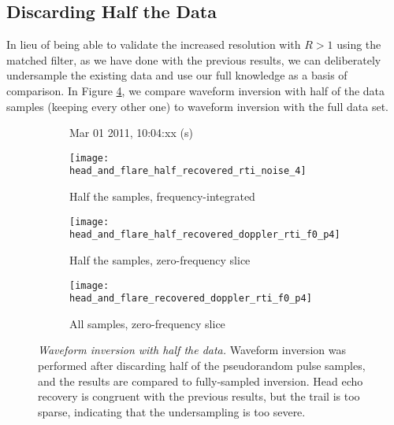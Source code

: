 \subsection{Discarding Half the Data}
In lieu of being able to validate the increased resolution with $R>1$ using the matched filter, as we have done with the previous results, we can deliberately undersample the existing data and use our full knowledge as a basis of comparison. In Figure \ref{fig:half_sampling_comparison}, we compare waveform inversion with half of the data samples (keeping every other one) to waveform inversion with the full data set.
\begin{figure}[tpb]
 \vspace{-1.5\baselineskip}
 \begin{subfigure}{\textwidth}
  \centering
  \textsf{\footnotesize Mar 01 2011, 10:04:xx (s)}
  
  \texttt{[image: head\_and\_flare\_half\_recovered\_rti\_noise\_4]}
  \caption{Half the samples, frequency-integrated}
  \label{fig:half_recovered}
 \end{subfigure}
 
 \vspace{0.5\baselineskip}
 \begin{subfigure}{\textwidth}
  \centering
  \texttt{[image: head\_and\_flare\_half\_recovered\_doppler\_rti\_f0\_p4]}
  \caption{Half the samples, zero-frequency slice}
  \label{fig:half_recovered_doppler0}
 \end{subfigure}
 
 \vspace{0.5\baselineskip}
 \begin{subfigure}{\textwidth}
  \centering
  \texttt{[image: head\_and\_flare\_recovered\_doppler\_rti\_f0\_p4]}
  \caption{All samples, zero-frequency slice}
  \label{fig:recovered_doppler0}
 \end{subfigure}
 \caption[Waveform inversion with half the data]{\emph{Waveform inversion with half the data.} Waveform inversion was performed after discarding half of the pseudorandom pulse samples, and the results are compared to fully-sampled inversion. Head echo recovery is congruent with the previous results, but the trail is too sparse, indicating that the undersampling is too severe.}
 \label{fig:half_sampling_comparison}
\end{figure}%
